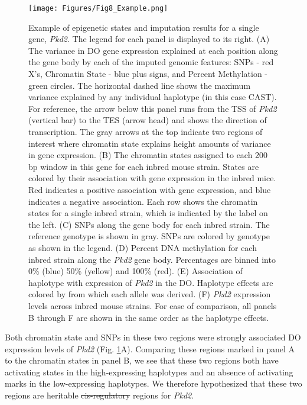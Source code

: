 \documentclass[
  11pt,
]{article}
\providecommand{\DIFaddtex}[1]{{\protect\color{blue}\uwave{#1}}} %
\providecommand{\DIFdeltex}[1]{{\protect\color{red}\sout{#1}}}                      %
\providecommand{\DIFaddbegin}{} %
\providecommand{\DIFaddend}{} %
\providecommand{\DIFdelbegin}{} %
\providecommand{\DIFdelend}{} %
\providecommand{\DIFadd}[1]{\texorpdfstring{\DIFaddtex{#1}}{#1}} %
\providecommand{\DIFdel}[1]{\texorpdfstring{\DIFdeltex{#1}}{}} %
\newcommand{\DIFscaledelfig}{0.5}
\newlength{\DIFdelgraphicswidth} %
\newlength{\DIFdelgraphicsheight} %
\newcommand{\DIFaddincludegraphics}[2][]{{\color{blue}\fbox{\DIFOincludegraphics[#1]{#2}}}} %
\newcommand{\DIFdelincludegraphics}[2][]{%
\sbox{\DIFdelgraphicsbox}{\DIFOincludegraphics[#1]{#2}}%
\settoboxwidth{\DIFdelgraphicswidth}{\DIFdelgraphicsbox} %
\settoboxtotalheight{\DIFdelgraphicsheight}{\DIFdelgraphicsbox} %
\scalebox{\DIFscaledelfig}{%
\parbox[b]{\DIFdelgraphicswidth}{\usebox{\DIFdelgraphicsbox}\\[-\baselineskip] \rule{\DIFdelgraphicswidth}{0em}}\llap{\resizebox{\DIFdelgraphicswidth}{\DIFdelgraphicsheight}{%
\setlength{\unitlength}{\DIFdelgraphicswidth}%
\begin{picture}(1,1)%
\thicklines\linethickness{2pt} %
{\color[rgb]{1,0,0}\put(0,0){\framebox(1,1){}}}%
{\color[rgb]{1,0,0}\put(0,0){\line( 1,1){1}}}%
{\color[rgb]{1,0,0}\put(0,1){\line(1,-1){1}}}%
\end{picture}%
}\hspace*{3pt}}} %
} %
\DeclareRobustCommand{\DIFaddbegin}{\DIFOaddbegin \let\includegraphics\DIFaddincludegraphics} %
\DeclareRobustCommand{\DIFaddend}{\DIFOaddend \let\includegraphics\DIFOincludegraphics} %
\DeclareRobustCommand{\DIFdelbegin}{\DIFOdelbegin \let\includegraphics\DIFdelincludegraphics} %
\DeclareRobustCommand{\DIFdelend}{\DIFOaddend \let\includegraphics\DIFOincludegraphics} %
\begin{document}
\begin{figure}[ht!]
\texttt{[image: Figures/Fig8\_Example.png]} 
\caption{Example of epigenetic states and imputation results for a single 
gene, \textit{Pkd2}. The legend for each panel is displayed to its right.
(A) The variance in DO gene expression explained at 
each position along the gene body by each of the imputed genomic 
features: SNPs - red X's, Chromatin State - blue plus signs, and 
Percent Methylation - green circles. The horizontal 
dashed line shows the maximum variance explained by any individual 
haplotype (in this case CAST). For reference, the arrow below 
this panel runs from the TSS of \textit{Pkd2} (vertical bar) to the 
TES (arrow head) and shows the direction of transcription. The 
gray arrows at the top indicate two regions of interest where 
chromatin state explains height amounts of variance in gene expression. 
(B) The chromatin states assigned to each 200 bp window in this gene 
for each inbred mouse strain. States are colored by their association 
with gene expression in the inbred mice. Red indicates a positive 
association with gene expression, and blue indicates a negative 
association. Each row shows the chromatin states for a single inbred 
strain, which is indicated by the label on the left. (C) SNPs along 
the gene body for each inbred strain. The reference genotype is shown 
in gray. SNPs are colored by genotype as shown in the legend. (D) Percent 
DNA methylation for each inbred strain along the \textit{Pkd2} gene body. 
Percentages are binned into 0\% (blue) 50\% (yellow) and 100\% (red). (E) 
Association of haplotype with expression of \textit{Pkd2} in the DO. Haplotype 
effects are colored by from which each allele was derived. (F) \textit{Pkd2} 
expression levels across inbred mouse strains. For ease of comparison, 
all panels B through F are shown in the same order as the haplotype effects.}
\label{fig:example_gene}
\end{figure}

Both chromatin state and SNPs in these two regions were strongly
associated DO expression levels of \textit{Pkd2} (Fig.
\ref{fig:example_gene}A). Comparing these regions marked in panel A to
the chromatin states in panel B, we see that these two regions both have
activating states in the high-expressing haplotypes and an absence of
activating marks in the low-expressing haplotypes. We therefore
hypothesized that these two regions are heritable
\DIFdelbegin \DIFdel{cis-regulatory }\DIFdelend \DIFaddbegin \textit{\DIFadd{cis}}\DIFadd{-regulatory }\DIFaddend regions for \textit{Pkd2}.
\end{document}
